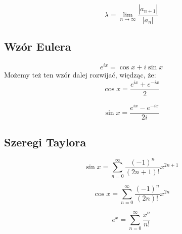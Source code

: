\documentclass{../notatki}
\begin{document}
$$
\lambda = \lim_{n \to \infty} \frac{|a_{n+1}|}{|a_n|}
$$

\subsection{Wzór Eulera}

$$
e^{ix} = \cos x + i \sin x
$$
Możemy też ten wzór dalej rozwijać, więdząc, że:
$$
\cos x = \frac{e^{ix} + e^{-ix}}{2}
$$

$$
\sin x = \frac{e^{ix} - e^{-ix}}{2i}
$$

\subsection{Szeregi Taylora}

$$
\sin x = \sum_{n=0}^\infty \frac{(-1)^n}{(2n+1)!} x^{2n+1}
$$

$$
\cos x = \sum_{n=0}^\infty \frac{(-1)^n}{(2n)!} x^{2n}
$$

$$
e^x = \sum_{n=0}^\infty \frac{x^n}{n!}
$$
\end{document}
